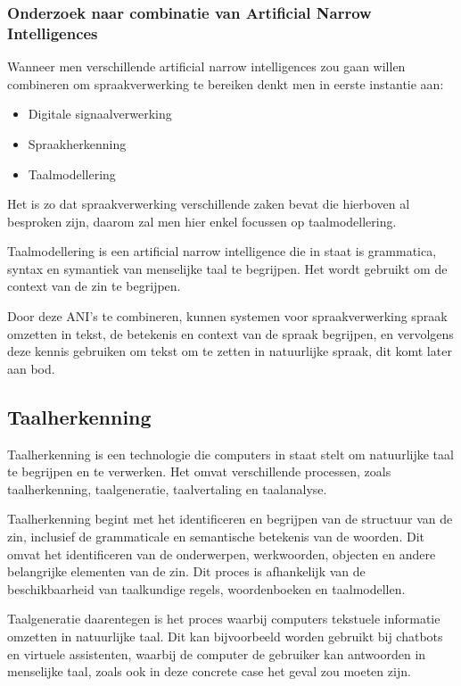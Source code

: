 \subsubsection{Onderzoek naar combinatie van Artificial Narrow Intelligences}

Wanneer men verschillende artificial narrow intelligences zou gaan willen combineren om spraakverwerking te bereiken denkt men in eerste instantie aan:

\begin{itemize}
    \item Digitale signaalverwerking
    \item Spraakherkenning
    \item Taalmodellering
\end{itemize}

Het is zo dat spraakverwerking verschillende zaken bevat die hierboven al besproken zijn, daarom zal men hier enkel focussen op taalmodellering.

Taalmodellering is een artificial narrow intelligence die in staat is grammatica, syntax en symantiek van menselijke taal te begrijpen. Het wordt gebruikt om de context van de zin te begrijpen.

Door deze ANI's te combineren, kunnen systemen voor spraakverwerking spraak omzetten in tekst, de betekenis en context van de spraak begrijpen, en vervolgens deze kennis gebruiken om tekst om te zetten in natuurlijke spraak, dit komt later aan bod.

\subsection{Taalherkenning}

Taalherkenning is een technologie die computers in staat stelt om natuurlijke taal te begrijpen en te verwerken. Het omvat verschillende processen, zoals taalherkenning, taalgeneratie, taalvertaling en taalanalyse.

Taalherkenning begint met het identificeren en begrijpen van de structuur van de zin, inclusief de grammaticale en semantische betekenis van de woorden. Dit omvat het identificeren van de onderwerpen, werkwoorden, objecten en andere belangrijke elementen van de zin. Dit proces is afhankelijk van de beschikbaarheid van taalkundige regels, woordenboeken en taalmodellen.

Taalgeneratie daarentegen is het proces waarbij computers tekstuele informatie omzetten in natuurlijke taal. Dit kan bijvoorbeeld worden gebruikt bij chatbots en virtuele assistenten, waarbij de computer de gebruiker kan antwoorden in menselijke taal, zoals ook in deze concrete case het geval zou moeten zijn.


